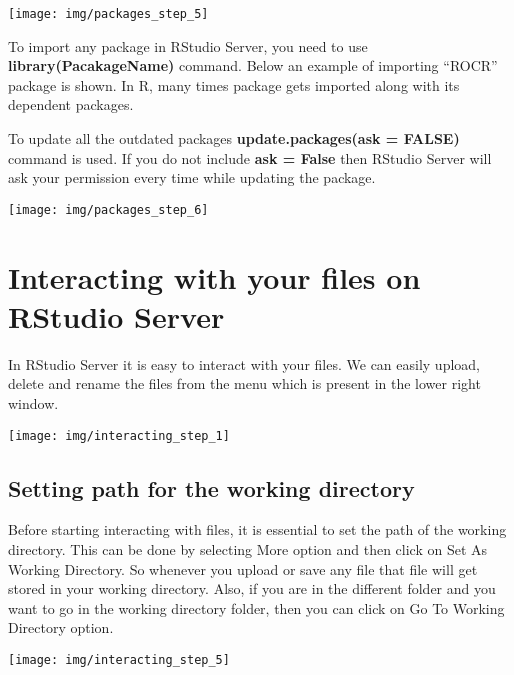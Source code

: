 \documentclass[
]{book}
\begin{document}
\begin{center}\texttt{[image: img/packages\_step\_5]} \end{center}

To import any package in RStudio Server, you need to use \textbf{library(PacakageName)} command. Below an example of importing ``ROCR'' package is shown. In R, many times package gets imported along with its dependent packages.

To update all the outdated packages \textbf{update.packages(ask = FALSE)} command is used. If you do not include \textbf{ask = False} then RStudio Server will ask your permission every time while updating the package.

\begin{center}\texttt{[image: img/packages\_step\_6]} \end{center}

\hypertarget{interacting-with-your-files-on-rstudio-server}{%
\section{Interacting with your files on RStudio Server}\label{interacting-with-your-files-on-rstudio-server}}

In RStudio Server it is easy to interact with your files. We can easily upload, delete and rename the files from the menu which is present in the lower right window.

\begin{center}\texttt{[image: img/interacting\_step\_1]} \end{center}

\hypertarget{setting-path-for-the-working-directory}{%
\subsection{Setting path for the working directory}\label{setting-path-for-the-working-directory}}

Before starting interacting with files, it is essential to set the path of the working directory. This can be done by selecting More option and then click on Set As Working Directory. So whenever you upload or save any file that file will get stored in your working directory. Also, if you are in the different folder and you want to go in the working directory folder, then you can click on Go To Working Directory option.

\begin{center}\texttt{[image: img/interacting\_step\_5]} \end{center}
\end{document}
